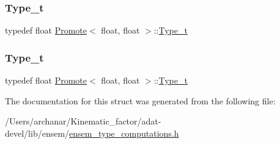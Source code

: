 \subsubsection{\texorpdfstring{Type\_t}{Type\_t}\hspace{0.1cm}{\footnotesize\ttfamily [2/3]}}
{\footnotesize\ttfamily typedef float \mbox{\hyperlink{structPromote}{Promote}}$<$ float, float $>$\+::\mbox{\hyperlink{structPromote_3_01float_00_01float_01_4_a7a0db669ca1c2569d700f8e431371d30}{Type\+\_\+t}}}

\mbox{\label{structPromote_3_01float_00_01float_01_4_a7a0db669ca1c2569d700f8e431371d30}} 
\subsubsection{\texorpdfstring{Type\_t}{Type\_t}\hspace{0.1cm}{\footnotesize\ttfamily [3/3]}}
{\footnotesize\ttfamily typedef float \mbox{\hyperlink{structPromote}{Promote}}$<$ float, float $>$\+::\mbox{\hyperlink{structPromote_3_01float_00_01float_01_4_a7a0db669ca1c2569d700f8e431371d30}{Type\+\_\+t}}}



The documentation for this struct was generated from the following file\+:\begin{DoxyCompactItemize}
\item 
/\+Users/archanar/\+Kinematic\+\_\+factor/adat-\/devel/lib/ensem/\mbox{\hyperlink{adat-devel_2lib_2ensem_2ensem__type__computations_8h}{ensem\+\_\+type\+\_\+computations.\+h}}\end{DoxyCompactItemize}
